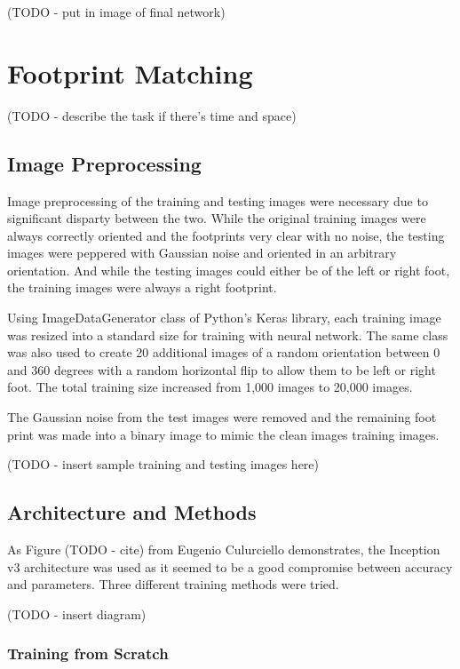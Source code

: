 \documentclass{article}
\begin{document}
(TODO - put in image of final network)

\section{Footprint Matching}

(TODO - describe the task if there's time and space)

\subsection{Image Preprocessing}

Image preprocessing of the training and testing images were necessary due to significant disparty between the two. While the original training images were always correctly oriented and the footprints very clear with no noise, the testing images were peppered with Gaussian noise and oriented in an arbitrary orientation. And while the testing images could either be of the left or right foot, the training images were always a right footprint.

Using ImageDataGenerator class of Python's Keras library, each training image was resized into a standard size for training with neural network. The same class was also used to create 20 additional images of a random orientation between 0 and 360 degrees with a random horizontal flip to allow them to be left or right foot. The total training size increased from 1,000 images to 20,000 images.

The Gaussian noise from the test images were removed and the remaining foot print was made into a binary image to mimic the clean images training images. 

(TODO - insert sample training and testing images here)

\subsection{Architecture and Methods}

As Figure (TODO - cite) from Eugenio Culurciello demonstrates, the Inception v3 architecture was used as it seemed to be a good compromise between accuracy and parameters. Three different training methods were tried.

(TODO - insert diagram)

\subsubsection{Training from Scratch}
\end{document}
